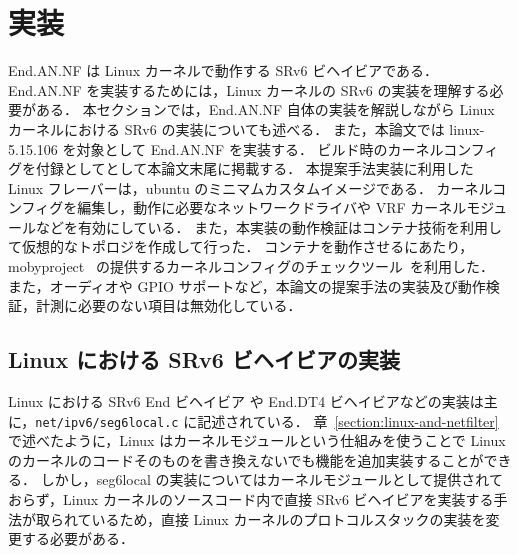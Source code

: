 \section{実装}
\label{section:implementation}
End.AN.NF は Linux カーネルで動作する SRv6 ビヘイビアである．
End.AN.NF を実装するためには，Linux カーネルの SRv6 の実装を理解する必要がある．
本セクションでは，End.AN.NF 自体の実装を解説しながら Linux カーネルにおける SRv6 の実装についても述べる．
また，本論文では linux-5.15.106 を対象として End.AN.NF を実装する．
ビルド時のカーネルコンフィグを付録としてとして本論文末尾に掲載する．
本提案手法実装に利用した Linux フレーバーは，ubuntu のミニマムカスタムイメージである．
カーネルコンフィグを編集し，動作に必要なネットワークドライバや VRF カーネルモジュールなどを有効にしている．
また，本実装の動作検証はコンテナ技術を利用して仮想的なトポロジを作成して行った．
コンテナを動作させるにあたり，mobyproject~\cite{moby} の提供するカーネルコンフィグのチェックツール~\cite{mobysh}を利用した．
また，オーディオや GPIO サポートなど，本論文の提案手法の実装及び動作検証，計測に必要のない項目は無効化している．


\subsection{Linux における SRv6 ビヘイビアの実装}
\label{sbsection:linux-packet-forwarding}
Linux における SRv6 End ビヘイビア や End.DT4 ビヘイビアなどの実装は主に，\texttt{net/ipv6/seg6local.c} に記述されている．
章~\ref{section:linux-and-netfilter} で述べたように，Linux はカーネルモジュールという仕組みを使うことで Linux のカーネルのコードそのものを書き換えないでも機能を追加実装することができる．
しかし，seg6local の実装についてはカーネルモジュールとして提供されておらず，Linux カーネルのソースコード内で直接 SRv6 ビヘイビアを実装する手法が取られているため，直接 Linux カーネルのプロトコルスタックの実装を変更する必要がある．


